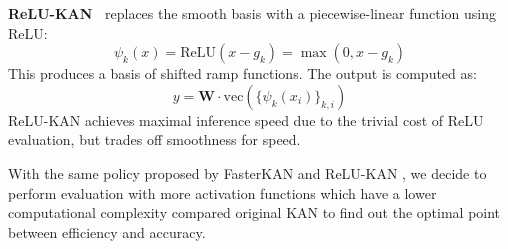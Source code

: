 \documentclass[a4paper]{report}
\begin{document}
\textbf{ReLU-KAN~\cite{qiu2024relukan}} replaces the smooth basis with a piecewise-linear function using ReLU:
\begin{equation}
    \psi_k(x) = \text{ReLU}(x - g_k) = \max(0, x - g_k)
\end{equation}
This produces a basis of shifted ramp functions. The output is computed as:
\begin{equation}
    y = \mathbf{W} \cdot \text{vec}\left(\{\psi_k(x_i)\}_{k,i}\right)
\end{equation}
ReLU-KAN achieves maximal inference speed due to the trivial cost of ReLU evaluation, but trades off smoothness for speed.

With the same policy proposed by FasterKAN \cite{fasterkan2024} and ReLU-KAN \cite{qiu2024relukan}, we decide to perform evaluation with more activation functions which have a lower computational complexity compared original KAN to find out the optimal point between efficiency and accuracy.
\end{document}

